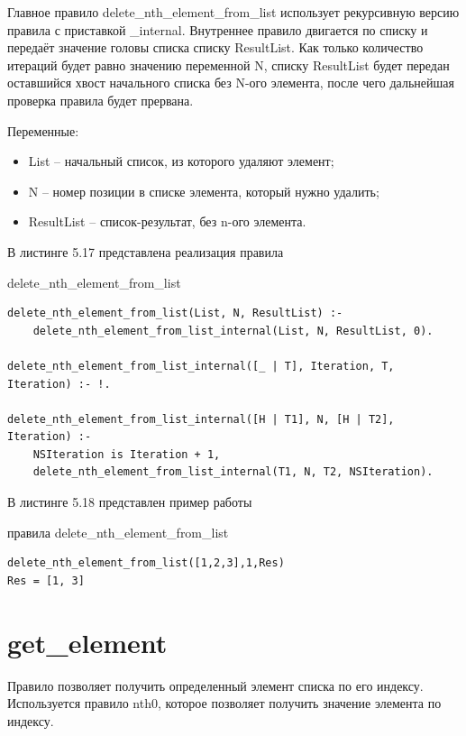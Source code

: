 \documentclass[12pt]{report}
\begin{document}
Главное правило delete\_nth\_element\_from\_list использует рекурсивную версию правила с приставкой \_internal. Внутреннее правило двигается по списку и передаёт значение головы списка списку ResultList. Как только количество итераций будет равно значению переменной N, списку ResultList будет передан оставшийся хвост начального списка без N-ого элемента, после чего дальнейшая проверка правила будет прервана.

Переменные:
\begin{itemize}
\item List – начальный список, из которого удаляют элемент;
\item N – номер позиции в списке элемента, который нужно удалить;
\item ResultList – список-результат, без n-ого элемента.
\end{itemize}

В листинге 5.17 представлена реализация правила

delete\_nth\_element\_from\_list

\begin{lstlisting}[label=some-code, caption=реализация правила delete\_nth\_element\_from\_list]
delete_nth_element_from_list(List, N, ResultList) :-
	delete_nth_element_from_list_internal(List, N, ResultList, 0).

delete_nth_element_from_list_internal([_ | T], Iteration, T, Iteration) :- !.

delete_nth_element_from_list_internal([H | T1], N, [H | T2], Iteration) :-
	NSIteration is Iteration + 1,
	delete_nth_element_from_list_internal(T1, N, T2, NSIteration).

\end{lstlisting}
В листинге 5.18 представлен пример работы 

правила delete\_nth\_element\_from\_list

\begin{lstlisting}[label=some-code, caption=пример работы правила delete\_nth\_element\_from\_list]
delete_nth_element_from_list([1,2,3],1,Res)
Res = [1, 3]
\end{lstlisting}

\section{get\_element}
Правило позволяет получить определенный элемент списка по его индексу. Используется правило nth0, которое позволяет получить значение элемента по индексу.
\end{document}
